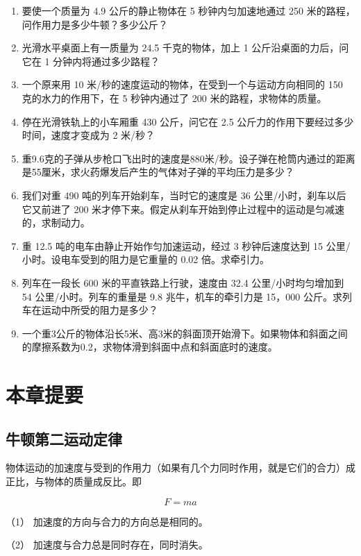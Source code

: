 \begin{enumerate}
\def\labelenumi{\arabic{enumi}.}
\item
  要使一个质量为 4.9 公斤的静止物体在 5 秒钟内匀加速地通过 250
  米的路程，问作用力是多少牛顿？多少公斤？
\item
  光滑水平桌面上有一质量为 24.5 千克的物体，加上 1
  公斤沿桌面的力后，问它在 1 分钟内将通过多少路程？
\item
  一个原来用 10 米/秒的速度运动的物体，在受到一个与运动方向相同的 150
  克的水力的作用下，在 5 秒钟内通过了 200 米的路程，求物体的质量。
\item
  停在光滑铁轨上的小车厢重 430 公斤，问它在 2.5
  公斤力的作用下要经过多少时间，速度才变成为 2 米/秒？
\item
  重9.6克的子弹从步枪口飞出时的速度是880米/秒。设子弹在枪筒内通过的距离是55厘米，求火药爆发后产生的气体对子弹的平均压力是多少？
\item
  我们对重 490 吨的列车开始刹车，当时它的速度是 36
  公里/小时，刹车以后它又前进了 200
  米才停下来。假定从刹车开始到停止过程中的运动是匀减速的，求制动力。
\item
  重 12.5 吨的电车由静止开始作匀加速运动，经过 3 秒钟后速度达到 15
  公里/小时。设电车受到的阻力是它重量的 0.02 倍。求牵引力。
\item
  列车在一段长 600 米的平直铁路上行驶，速度由 32.4 公里/小时均匀增加到
  54 公里/小时。列车的重量是 9.8 兆牛，机车的牵引力是 15，000
  公斤。求列车在运动中所受的阻力是多少？
\item
  一个重3公斤的物体沿长5米、高3米的斜面顶开始滑下。如果物体和斜面之间的摩擦系数为0.2，求物体滑到斜面中点和斜面底时的速度。
\end{enumerate}

\section{本章提要}\label{ux672cux7ae0ux63d0ux8981-6}

\subsection{牛顿第二运动定律}\label{ux725bux987fux7b2cux4e8cux8fd0ux52a8ux5b9aux5f8b-1}

物体运动的加速度与受到的作用力（如果有几个力同时作用，就是它们的合力）成正比，与物体的质量成反比。即

\[
F = m a
\]

（1） 加速度的方向与合力的方向总是相同的。

（2） 加速度与合力总是同时存在，同时消失。

